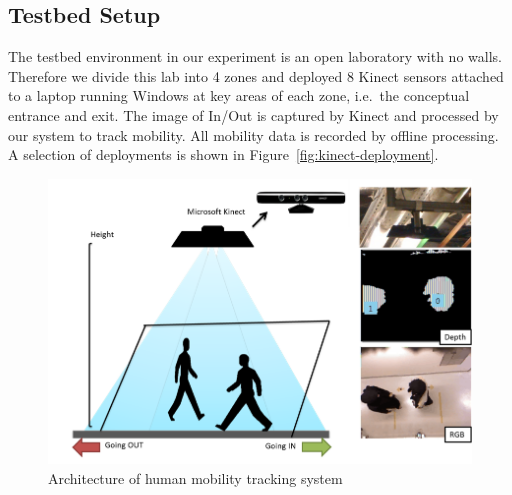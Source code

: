 \documentclass{sig-alternate}
\begin{document}
\subsection{Testbed Setup}
\label{sec:testbed-setup}

The testbed environment in our experiment is an open laboratory with
no walls. Therefore we divide this lab into 4 zones and deployed 8
Kinect sensors attached to a laptop running Windows at key areas of
each zone, i.e.\ the conceptual entrance and exit. The image of In/Out
is captured by Kinect and processed by our system to track
mobility. All mobility data is recorded by offline processing. A
selection of deployments is shown in
Figure~\ref{fig:kinect-deployment}.  




\begin{figure}[!tb]
  \centering
  \includegraphics[scale=0.6]{minisys}
  \caption{Architecture of human mobility tracking system}
  \label{fig:system-arch}
\end{figure}
\end{document}
